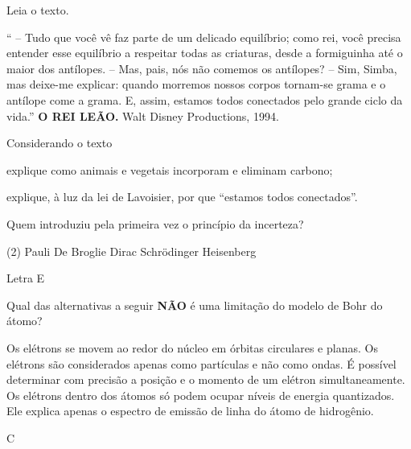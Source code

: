 \documentclass[11pt]{article}
\begin{document}
\begin{exercise}
Leia o texto.

“ -- Tudo que você vê faz parte de um delicado equilíbrio; como rei, você precisa entender esse equilíbrio a respeitar todas as criaturas, desde a formiguinha até o maior dos antílopes.
-- Mas, pais, nós não comemos os antílopes?
-- Sim, Simba, mas deixe-me explicar: quando morremos nossos corpos tornam-se grama e o antílope come a grama. E, assim, estamos todos conectados pelo grande ciclo da vida.”
{\small {\bfseries O REI LEÃO.} Walt Disney Productions, 1994.}

Considerando o texto

\begin{choice}
\choice explique como animais e vegetais incorporam e eliminam carbono;

\blank[blank-style={\phantom{#1}},width=12\linewidth]{}


\choice explique, à luz da lei de Lavoisier, por que “estamos todos conectados”.


\blank[blank-style={\phantom{#1}},width=12\linewidth]{}


\end{choice}
\end{exercise}












\begin{exercise}
Quem introduziu pela primeira vez o princípio da incerteza?

\begin{choice}(2)
\choice Pauli
\choice De Broglie
\choice Dirac
\choice Schrödinger
\choice Heisenberg
\end{choice}
\end{exercise}
\begin{solution}
Letra E
\end{solution}




\begin{exercise}
Qual das alternativas a seguir \textbf{NÃO} é uma limitação do modelo de Bohr do átomo?

\begin{choice}
\choice Os elétrons se movem ao redor do núcleo em órbitas circulares e planas.
\choice Os elétrons são considerados apenas como partículas e não como ondas.
\choice É possível determinar com precisão a posição e o momento de um elétron simultaneamente.
\choice Os elétrons dentro dos átomos só podem ocupar níveis de energia quantizados.
\choice Ele explica apenas o espectro de emissão de linha do átomo de hidrogênio.
\end{choice}
\end{exercise}
\begin{solution}
C
\end{solution}
\end{document}
